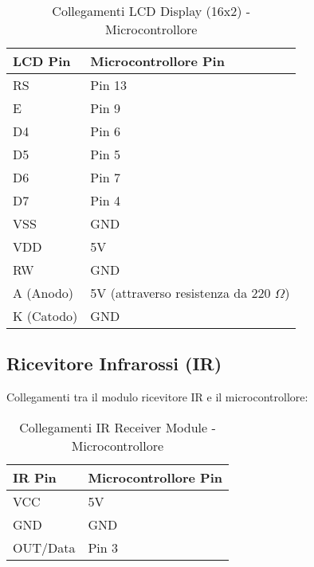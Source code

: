 \documentclass[a4paper, 12pt]{article}
\begin{document}
\begin{table}[H]
    \centering
    \caption{Collegamenti LCD Display (16x2) - Microcontrollore}
    \label{tab:lcd-16x2-connections}
    \begin{tabular}{ll}
        \toprule
        \textbf{LCD Pin} & \textbf{Microcontrollore Pin}      \\
        \midrule
        RS               & Pin 13                             \\
        E                & Pin 9                              \\
        D4               & Pin 6                              \\
        D5               & Pin 5                              \\
        D6               & Pin 7                              \\
        D7               & Pin 4                              \\
        VSS              & GND                                \\
        VDD              & 5V                                 \\
        RW               & GND                                \\
        A (Anodo)        & 5V (attraverso resistenza da 220 \(\Omega\)) \\
        K (Catodo)       & GND                                \\
        \bottomrule
    \end{tabular}
\end{table}

\subsection{Ricevitore Infrarossi (IR)}
\label{subsec:setup-ir}
Collegamenti tra il modulo ricevitore IR e il microcontrollore:

\begin{table}[H]
    \centering
    \caption{Collegamenti IR Receiver Module - Microcontrollore}
    \label{tab:ir-receiver-connections}
    \begin{tabular}{ll}
        \toprule
        \textbf{IR Pin} & \textbf{Microcontrollore Pin} \\
        \midrule
        VCC             & 5V                            \\
        GND             & GND                           \\
        OUT/Data        & Pin 3                         \\
        \bottomrule
    \end{tabular}
\end{table}
\end{document}
